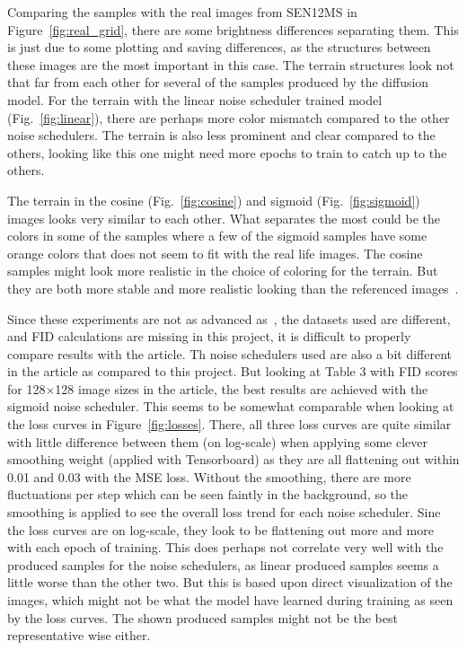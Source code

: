 \documentclass[fullpaper]{nldl}
\begin{document}
Comparing the samples with the real images from SEN12MS in Figure~\ref{fig:real_grid}, there are some brightness differences separating them. This is just due to some plotting and saving differences, as the structures between these images are the most important in this case. The terrain structures look not that far from each other for several of the samples produced by the diffusion model. For the terrain with the linear noise scheduler trained model (Fig.~\ref{fig:linear}), there are perhaps more color mismatch compared to the other noise schedulers. The terrain is also less prominent and clear compared to the others, looking like this one might need more epochs to train to catch up to the others.

The terrain in the cosine (Fig.~\ref{fig:cosine}) and sigmoid (Fig.~\ref{fig:sigmoid}) images looks very similar to each other. What separates the most could be the colors in some of the samples where a few of the sigmoid samples have some orange colors that does not seem to fit with the real life images. The cosine samples might look more realistic in the choice of coloring for the terrain. But they are both more stable and more realistic looking than the referenced images~\cite{adamiak2023GenAI}.

Since these experiments are not as advanced as~\cite{chen2023importance}, the datasets used are different, and FID calculations are missing in this project, it is difficult to properly compare results with the article. Th noise schedulers used are also a bit different in the article as compared to this project. But looking at Table 3 with FID scores for 128$\times$128 image sizes in the article, the best results are achieved with the sigmoid noise scheduler. This seems to be somewhat comparable when looking at the loss curves in Figure~\ref{fig:losses}. There, all three loss curves are quite similar with little difference between them (on log-scale) when applying some clever smoothing weight (applied with Tensorboard) as they are all flattening out within 0.01 and 0.03 with the MSE loss. Without the smoothing, there are more fluctuations per step which can be seen faintly in the background, so the smoothing is applied to see the overall loss trend for each noise scheduler. Sine the loss curves are on log-scale, they look to be flattening out more and more with each epoch of training. This does perhaps not correlate very well with the produced samples for the noise schedulers, as linear produced samples seems a little worse than the other two. But this is based upon direct visualization of the images, which might not be what the model have learned during training as seen by the loss curves. The shown produced samples might not be the best representative wise either.
\end{document}
